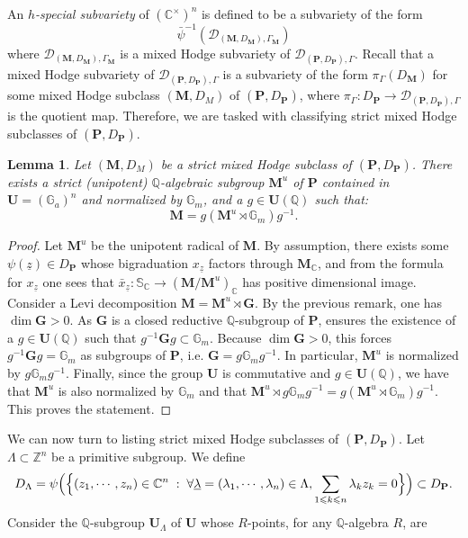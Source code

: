 \documentclass[10pt]{article}
\numberwithin{equation}{subsection}
\theoremstyle{plain}
\newtheorem{lemma}[theorem]{Lemma}
\theoremstyle{definition}
\theoremstyle{remark}
\newcommand{\Z}{\mathbb Z}
\newcommand{\Q}{\mathbb Q}
\newcommand{\C}{\mathbb C}
\newcommand{\s}{\mathbb S}
\newcommand{\mult}{\mathbb G}
\newcommand{\G}{\mathbf G}
\newcommand{\pp}{\mathbf P}
\newcommand{\uu}{\mathbf U}
\newcommand{\M}{\mathbf M}
\newcommand{\period}{\mathscr{D}}
\newcommand{\zz}{\underline{z}}
\newcommand{\lambdaa}{\underline{\lambda}}
\begin{document}
An \textit{$h$-special subvariety} of $(\C^\times)^n$ is defined to be a subvariety of the form \[\bar{\psi}^{-1}(\period_{(\M, D_\M), \Gamma_\M})\] where $\period_{(\M, D_\M), \Gamma_\M}$ is a mixed Hodge subvariety of $\period_{(\pp, D_\pp),\Gamma}$. Recall that a mixed Hodge subvariety of $\period_{(\pp, D_\pp), \Gamma}$ is a subvariety of the form $\pi_\Gamma(D_\M)$ for some mixed Hodge subclass $(\M, D_M)$ of $(\pp, D_\pp)$, where $\pi_\Gamma : D_\pp \rightarrow \period_{(\pp, D_\pp), \Gamma}$ is the quotient map. Therefore, we are tasked with classifying strict mixed Hodge subclasses of $(\pp, D_\pp)$.
\begin{lemma}\label{structc}
Let $(\M,D_M)$ be a strict mixed Hodge subclass of $(\pp, D_\pp)$. There exists a strict (unipotent) $\Q$-algebraic subgroup $\M^u$ of $\pp$ contained in $\uu = (\mult_a)^n$ and normalized by $\mult_m$, and a $g \in \uu(\Q)$ such that:
\[ 
\M = g(\M^u \rtimes \mult_m)g^{-1}.
\]
\end{lemma}
\begin{proof}
Let $\M^u$ be the unipotent radical of $\M$. By assumption, there exists some $\psi(\zz) \in D_\pp$ whose bigraduation $x_{\zz}$ factors through $\M_\C$, and from the formula for $x_{\zz}$ one sees that $\bar{x}_{\zz} : \s_\C \rightarrow (\M/\M^u)_\C$ has positive dimensional image. Consider a Levi decomposition $\M = \M^u \rtimes \G$. By the previous remark, one has $\dim \G > 0$. As $\G$ is a closed reductive $\Q$-subgroup of $\pp$, \cite[Prop. 5.1]{borser} ensures the existence of a $g \in \uu(\Q)$ such that $g^{-1} \G g \subset \mult_m$. Because $\dim \G > 0$, this forces $g^{-1} \G g = \mult_m$ as subgroups of $\pp$, i.e. $\G = g \mult_m g^{-1}$. In particular, $\M^u$ is normalized by $g \mult_m g^{-1}$. Finally, since the group $\uu$ is commutative and $g \in \uu(\Q)$, we have that $\M^u$ is also normalized by $\mult_m$ and that $\M^u \rtimes g \mult_m g^{-1} = g (\M^u \rtimes \mult_m) g^{-1}$. This proves the statement.
\end{proof}
We can now turn to listing strict mixed Hodge subclasses of $(\pp, D_\pp)$. Let $\Lambda \subset \Z^n$ be a primitive subgroup. We define
\[
D_{\Lambda} = \psi \Big(\Big\{ (z_1, \cdots, z_n) \in \C^n \hspace{0.1cm} : \hspace{0.1cm} \forall \lambdaa = (\lambda_1, \cdots, \lambda_n) \in \Lambda,  \sum_{1 \leqslant k \leqslant n} \lambda_k z_k  = 0 \Big\}\Big) \subset D_\pp.
\]
Consider the $\Q$-subgroup $\uu_{\Lambda}$ of $\uu$ whose $R$-points, for any $\Q$-algebra $R$, are
\end{document}
